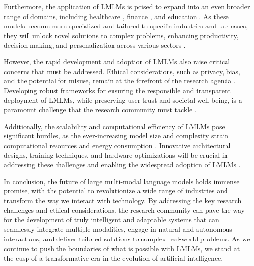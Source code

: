 \documentclass[11pt]{article}
\begin{document}
Furthermore, the application of LMLMs is poised to expand into an even broader range of domains, including healthcare \cite{ref193}, finance \cite{ref377}, and education \cite{ref110}. As these models become more specialized and tailored to specific industries and use cases, they will unlock novel solutions to complex problems, enhancing productivity, decision-making, and personalization across various sectors \cite{ref378}.

However, the rapid development and adoption of LMLMs also raise critical concerns that must be addressed. Ethical considerations, such as privacy, bias, and the potential for misuse, remain at the forefront of the research agenda \cite{ref102}. Developing robust frameworks for ensuring the responsible and transparent deployment of LMLMs, while preserving user trust and societal well-being, is a paramount challenge that the research community must tackle \cite{ref346}.

Additionally, the scalability and computational efficiency of LMLMs pose significant hurdles, as the ever-increasing model size and complexity strain computational resources and energy consumption \cite{ref336}. Innovative architectural designs, training techniques, and hardware optimizations will be crucial in addressing these challenges and enabling the widespread adoption of LMLMs \cite{ref354}.

In conclusion, the future of large multi-modal language models holds immense promise, with the potential to revolutionize a wide range of industries and transform the way we interact with technology. By addressing the key research challenges and ethical considerations, the research community can pave the way for the development of truly intelligent and adaptable systems that can seamlessly integrate multiple modalities, engage in natural and autonomous interactions, and deliver tailored solutions to complex real-world problems. As we continue to push the boundaries of what is possible with LMLMs, we stand at the cusp of a transformative era in the evolution of artificial intelligence.
\end{document}
